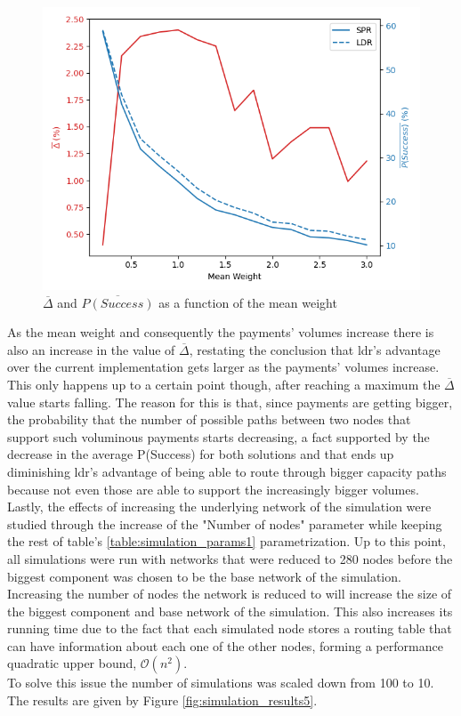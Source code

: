 \begin{figure}[H]
\begin{center}
  \includegraphics[width=\linewidth]{images/simulation_results4.png}
  \caption{$\overline{\Delta}$ and  $\overline{P(Success)}$ as a function of the mean weight}
  \label{fig:simulation_results4}
  \end{center}
\end{figure}

As the mean weight and consequently the payments' volumes increase there is also an increase in the value of $\overline{\Delta}$, restating the conclusion that \acrshort{ldr}'s advantage over the current implementation gets larger as the payments' volumes increase. This only happens up to a certain point though, after reaching a maximum the $\overline{\Delta}$ value starts falling. The reason for this is that, since payments are getting bigger, the probability that the number of possible paths between two nodes that support such voluminous payments starts decreasing, a fact supported by the decrease in the average P(Success) for both solutions and that ends up diminishing \acrshort{ldr}'s advantage of being able to route through bigger capacity paths because not even those are able to support the increasingly bigger volumes.\\
Lastly, the effects of increasing the underlying network of the simulation were studied through the increase of the "Number of nodes" parameter while keeping the rest of table's \ref{table:simulation_params1} parametrization. Up to this point, all simulations were run with networks that were reduced to 280 nodes before the biggest component was chosen to be the base network of the simulation. Increasing the number of nodes the network is reduced to will increase the size of the biggest component and base network of the simulation. This also increases its running time due to the fact that each simulated node stores a routing table that can have information about each one of the other nodes, forming a performance quadratic upper bound, $\mathcal{O}(n^2)$.\\
To solve this issue the number of simulations was scaled down from 100 to 10. The results are given by Figure \ref{fig:simulation_results5}.\\

